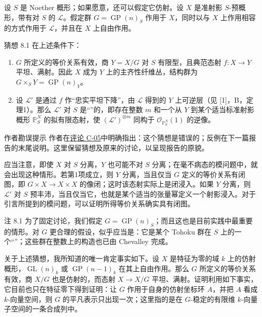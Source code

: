 设 $S$ 是 Noether 概形；如果愿意，还可以假定它仿射。设 $X$ 是准射影 $S$-预概形，带有对 $S$ 的 $\mathcal L$。假定群 $G=\operatorname{GP}(n)_S$ 作用于 $X$，同时以与 $X$ 上作用相容的方式作用于 $\mathcal L$，并且在 $X$ 上自由作用。

\begin{statement}{猜想 8.1}
在上述条件下：
\begin{enumerate}[label=\arabic*\textsuperscript{o}]
 \item $G$ 所定义的等价关系有效，商 $Y=X/G$ 对 $S$ 有限型，且典范态射 $f:X\to Y$ 平坦、满射。因此 $X$ 成为 $Y$ 上的主齐性纤维丛，结构群为 $G\times_SY=\operatorname{GP}(n)_Y$。
 \item 设 $\mathcal L'$ 是通过 $f$ 作“忠实平坦下降”，由 $\mathcal L$ 得到的 $Y$ 上可逆层（见 [1]，B，定理1）。那么 $\mathcal L'$ 对 $S$ 是“”的，即存在整数 $m$ 和一个从 $Y$ 到某个适当标准射影概形 $\mathbb P_S^N$ 的拟有限态射，使 $(\mathcal L')^{\otimes m}$ 同构于 $\mathcal O_{\mathbb P_S^N}(1)$ 的逆像。
\end{enumerate}
\end{statement}
\begin{statement}{作者勘误提示}
作者在\hyperref[orig:7]{评论 C-05}中明确指出：这个猜想是错误的；反例在下一篇报告的末尾说明。这里保留猜想及原来的讨论，以呈现报告的原貌。
\end{statement}

应当注意，即使 $X$ 对 $S$ 分离，$Y$ 也可能不对 $S$ 分离；在毫不病态的模问题中，就会出现这种情形。若第1项成立，则 $Y$ 分离，当且仅当 $G$ 定义的等价关系有闭图，即 $G\times X\to X\times X$ 的像闭；这时该态射实际上是闭浸入。如果 $Y$ 分离，则 $\mathcal L'$ 对 $S$ 预丰沛，当且仅当它，也就是某个适当的张量幂定义一个射影浸入。对于引言所提到的模问题，可以证明所得等价关系确实具有闭图。

\begin{statement}{注 8.1}
为了固定讨论，我们假定 $G=\operatorname{GP}(n)_S$；而且这也是目前实践中最重要的情形。对 $G$ 更合理的假设，似乎应当是：它是某个 Tohoku 群在 $S$ 上的一个“”；这些群在整数上的构造也已由 Chevalley 完成。

关于上述猜想，我所知道的唯一肯定事实如下。设 $X$ 是特征为零的域 $k$ 上的仿射概形，$\operatorname{GL}(n)_k$ 或 $\operatorname{GP}(n-1)_k$ 在其上自由作用。那么 $G$ 所定义的等价关系有效，商 $X/G$ 也是仿射的，而态射 $X\to X/G$ 平坦、满射。证明利用如下事实，它目前也只在特征零下得到证明：让 $G$ 作用于自身的仿射坐标环 $A$，并把 $A$ 看成 $k$-向量空间，则 $G$ 的平凡表示只出现一次；这里指的是在 $G$-稳定的有限维 $k$-向量子空间的一条合成列中。
\end{statement}

